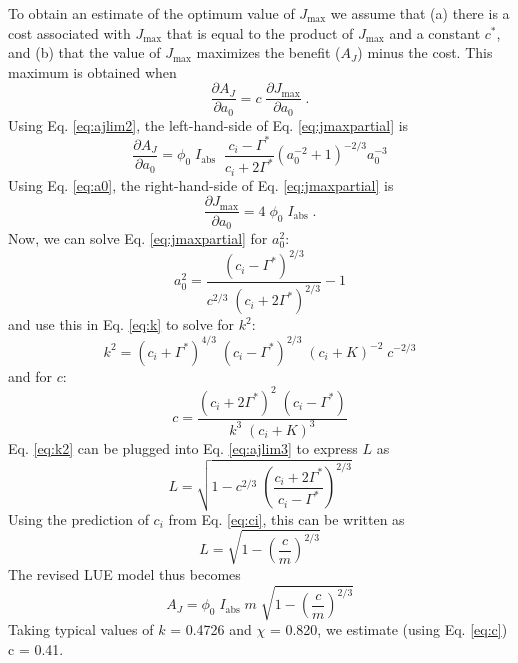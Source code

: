 \documentclass{myreport}
\begin{document}
To obtain an estimate of the optimum value of $J_{\mathrm{max}}$ we assume that (a) there is a cost associated with $J_{\mathrm{max}}$ that is equal to the product of $J_{\mathrm{max}}$ and a constant $c^{\ast}$, and (b) that the value of $J_{\mathrm{max}}$ maximizes the benefit ($A_J$) minus the cost. 
This maximum is obtained when
\begin{equation}
\label{eq:jmaxpartial}
    \frac{\partial A_J}{\partial a_0} = c \; \frac{\partial J_{\mathrm{max}}}{\partial a_0}\;.
\end{equation}
Using Eq. \ref{eq:ajlim2}, the left-hand-side of Eq. \ref{eq:jmaxpartial} is 
\begin{equation}
    \frac{\partial A_J}{\partial a_0} = \phi_0 \; I_{\mathrm{abs}} \; \; \frac{c_i - \Gamma^{\ast}}{c_i + 2\Gamma^{\ast}} \left( a_0^{-2} + 1 \right) ^{-2/3} a_0^{-3}
\end{equation}
Using Eq. \ref{eq:a0}, the right-hand-side of Eq. \ref{eq:jmaxpartial} is 
\begin{equation}
    \frac{\partial J_{\mathrm{max}}}{\partial a_0} = 4 \; \phi_0 \; I_{\mathrm{abs}}\;.
\end{equation}
Now, we can solve Eq. \ref{eq:jmaxpartial} for $a_0^2$:
\begin{equation}
\label{eq:a0}
a_0^2 = \frac{(c_i - \Gamma^{\ast})^{2/3}}{c^{2/3} \; (c_i+2\Gamma^{\ast})^{2/3}}-1
\end{equation}
and use this in Eq. \ref{eq:k} to solve for $k^2$:
\begin{equation}
\label{eq:k2}
k^2 = (c_i+ \Gamma^{\ast})^{4/3} \; (c_i - \Gamma^{\ast})^{2/3} \; (c_i + K)^{-2} \; c^{-2/3}
\end{equation}
and for $c$:
\begin{equation}
\label{eq:c}
    c = \frac{(c_i+2\Gamma^{\ast})^2\;(c_i-\Gamma^{\ast})}{k^3\;(c_i+K)^3}
\end{equation}
Eq. \ref{eq:k2} can be plugged into Eq. \ref{eq:ajlim3} to express $L$ as
\begin{equation}
    L = \sqrt{1-c^{2/3} \; \left( \frac{c_i+2\Gamma^{\ast}}{c_i-\Gamma^{\ast}}\right)^{2/3}  }
\end{equation}
Using the prediction of $c_i$ from Eq. \ref{eq:ci}, this can be written as
\begin{equation}
    L =  \sqrt{1 - \left( \frac{c}{m} \right)^{2/3} }
\end{equation}
The revised LUE model thus becomes
\begin{equation}
\label{eq:ajlim4}
    A_J = \phi_0 \; I_{\mathrm{abs}} \; m \; \sqrt{1 - \left( \frac{c}{m} \right)^{2/3} }
\end{equation}
Taking typical values of $k$ = 0.4726 and $\chi$ = 0.820, we estimate (using Eq. \ref{eq:c}) c = 0.41.
\end{document}
